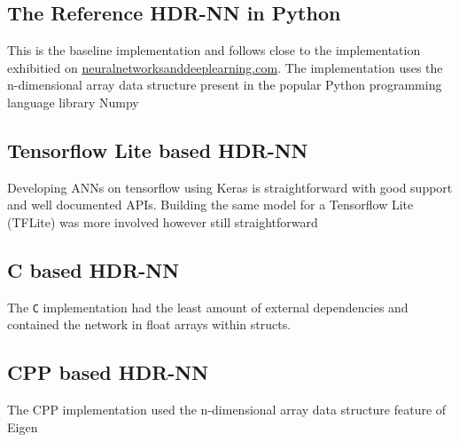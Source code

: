 \subsection[Python - Numpy]{The Reference HDR-NN in Python}

This is the baseline implementation and follows close to the implementation exhibitied on \href{http://neuralnetworksanddeeplearning.com}{neuralnetworksanddeeplearning.com}. The implementation uses the n-dimensional array data structure present in the popular Python programming language library Numpy

\subsection[Tensorflow Lite]{Tensorflow Lite based HDR-NN}

Developing ANNs on tensorflow using Keras is straightforward with good support and well documented APIs. Building the same model for a Tensorflow Lite (TFLite) was more involved however still straightforward

\subsection[C]{C based HDR-NN}

The \texttt{C} implementation had the least amount of external dependencies and contained the network in float arrays within structs.

\subsection[CPP - Eigen]{CPP based HDR-NN}

The CPP implementation used the n-dimensional array data structure feature of Eigen
